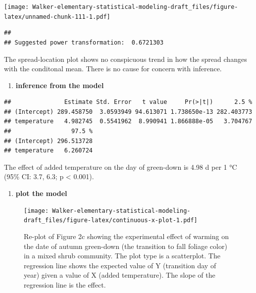 \documentclass[]{book}
\newenvironment{Shaded}{\begin{snugshade}}{\end{snugshade}}
\newcommand{\KeywordTok}[1]{\textcolor[rgb]{0.13,0.29,0.53}{\textbf{#1}}}
\newcommand{\NormalTok}[1]{#1}
\newcommand{\OperatorTok}[1]{\textcolor[rgb]{0.81,0.36,0.00}{\textbf{#1}}}
\newcommand{\StringTok}[1]{\textcolor[rgb]{0.31,0.60,0.02}{#1}}
\providecommand{\tightlist}{%
  \setlength{\itemsep}{0pt}\setlength{\parskip}{0pt}}
\begin{document}
\texttt{[image: Walker-elementary-statistical-modeling-draft\_files/figure-latex/unnamed-chunk-111-1.pdf]}

\begin{verbatim}
## 
## Suggested power transformation:  0.6721303
\end{verbatim}

The spread-location plot shows no conspicuous trend in how the spread changes with the conditonal mean. There is no cause for concern with inference.

\begin{enumerate}
\def\labelenumi{\arabic{enumi}.}
\setcounter{enumi}{4}
\tightlist
\item
  \textbf{inference from the model}
\end{enumerate}

\begin{Shaded}
\end{Shaded}

\begin{verbatim}
##               Estimate Std. Error   t value     Pr(>|t|)      2.5 %
## (Intercept) 289.458750  3.0593949 94.613071 1.738650e-13 282.403773
## temperature   4.982745  0.5541962  8.990941 1.866888e-05   3.704767
##                 97.5 %
## (Intercept) 296.513728
## temperature   6.260724
\end{verbatim}

The effect of added temperature on the day of green-down is 4.98 d per 1 °C (95\% CI: 3.7, 6.3; p \textless{} 0.001).

\begin{enumerate}
\def\labelenumi{\arabic{enumi}.}
\setcounter{enumi}{5}
\tightlist
\item
  \textbf{plot the model}
\end{enumerate}

\begin{figure}
\centering
\texttt{[image: Walker-elementary-statistical-modeling-draft\_files/figure-latex/continuous-x-plot-1.pdf]}
\caption{\label{fig:continuous-x-plot}Re-plot of Figure 2c showing the experimental effect of warming on the date of autumn green-down (the transition to fall foliage color) in a mixed shrub community. The plot type is a scatterplot. The regression line shows the expected value of Y (transition day of year) given a value of X (added temperature). The slope of the regression line is the effect.}
\end{figure}
\end{document}

